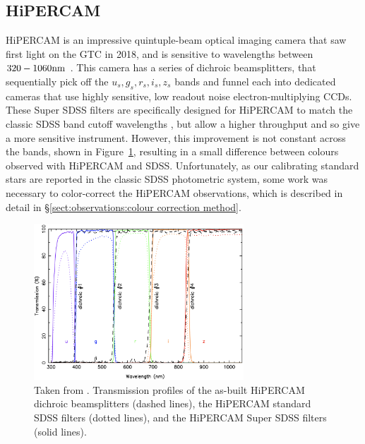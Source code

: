 \subsection{HiPERCAM}

HiPERCAM is an impressive quintuple-beam optical imaging camera that saw first light on the GTC in 2018, and is sensitive to wavelengths between $320 - 1060 \rm nm$ \citep{dhillon2021}. 
This camera has a series of dichroic beamsplitters, that sequentially pick off the $u_s, g_s, r_s, i_s, z_s$ bands and funnel each into dedicated cameras that use highly sensitive, low readout noise electron-multiplying CCDs. 
These Super SDSS filters are specifically designed for HiPERCAM to match the classic SDSS band cutoff wavelengths \citep{fukugita1996}, but allow a higher throughput and so give a more sensitive instrument. 
However, this improvement is not constant across the bands, shown in Figure~\ref{fig:observations:superSDSS throughput comparison}, resulting in a small difference between colours observed with HiPERCAM and SDSS. 
Unfortunately, as our calibrating standard stars are reported in the classic SDSS photometric system, some work was necessary to color-correct the HiPERCAM observations, which is described in detail in \S\ref{sect:observations:colour correction method}.
\begin{figure}
    \centering
    \includegraphics[width=0.7\textwidth]{figures/observations/plot_dichs_supersdss_asbuilt_v3.png}
    \caption{Taken from \citet{dhillon2021}. Transmission profiles of the as-built HiPERCAM dichroic beamsplitters (dashed lines), the HiPERCAM standard SDSS filters (dotted lines), and the HiPERCAM Super SDSS filters (solid
    lines).}
    \label{fig:observations:superSDSS throughput comparison}
\end{figure}

